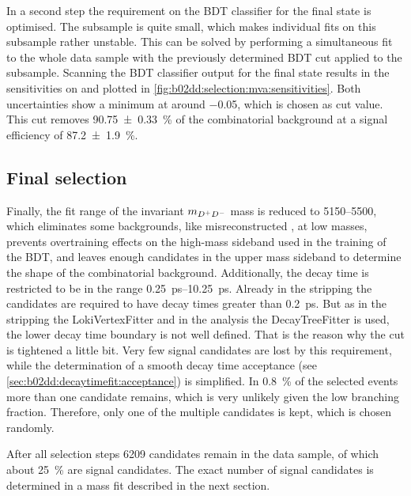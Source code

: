 In a second step the requirement on the BDT classifier for the \KKpiKpipi
final state is optimised. The \KKpiKpipi subsample is quite small, which makes
individual fits on this subsample rather unstable. This can be solved by
performing a simultaneous fit to the whole data sample with the previously
determined BDT cut applied to the \KpipiKpipi subsample. Scanning the BDT
classifier output for the \KKpiKpipi final state results in the sensitivities
on \SDD and \CDD plotted in \cref{fig:b02dd:selection:mva:sensitivities}. Both
uncertainties show a minimum at around \num{-0.05}, which is chosen as cut
value. This cut removes \SI{90.75\pm0.33}{\percent} of the combinatorial
background at a signal efficiency of \SI{87.2\pm1.9}{\percent}.

\subsection{Final selection}
\label{sec:b02dd:selection:final_selection}

Finally, the fit range of the invariant $m_{{{D}^+}{{D}^-}}$ mass is reduced to
\SIrange{5150}{5500}{\MeVcc}, which eliminates some backgrounds, like
misreconstructed \mbox{\BdToDstD}, at low masses, prevents overtraining
effects on the high-mass sideband used in the training of the BDT, and leaves
enough candidates in the upper mass sideband to determine the shape of the
combinatorial background. Additionally, the decay time is restricted to be in
the range \SIrange{0.25}{10.25}{\ps}. Already in the stripping the candidates
are required to have decay times greater than \SI{0.2}{\ps}. But as in the
stripping the LokiVertexFitter and in the analysis the DecayTreeFitter is
used, the lower decay time boundary is not well defined. That is the reason
why the cut is tightened a little bit. Very few signal candidates are lost by
this requirement, while the determination of a smooth decay time acceptance
(see \cref{sec:b02dd:decaytimefit:acceptance}) is simplified. In
\SI{0.8}{\percent} of the selected events more than one candidate remains,
which is very unlikely given the low branching fraction. Therefore, only one
of the multiple candidates is kept, which is chosen randomly.

After all selection steps \num{6209} candidates remain in the data sample, of
which about \SI{25}{\percent} are signal candidates. The exact number of
signal candidates is determined in a mass fit described in the next section.